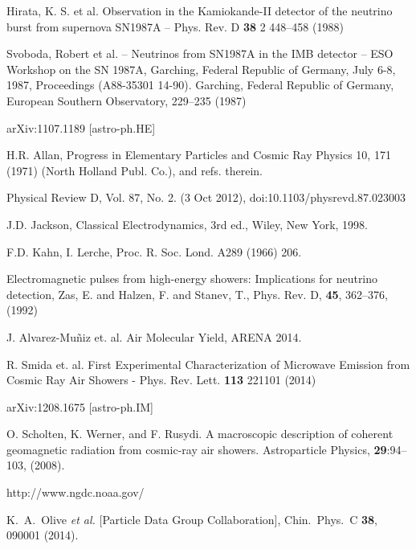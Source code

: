 \begin{thebibliography}{1}

 Hirata, K. S. et al. Observation in the Kamiokande-II detector of the neutrino burst from supernova SN1987A -- Phys. Rev. D \textbf{38} 2 448--458 (1988)

Svoboda, Robert et al. -- Neutrinos from SN1987A in the IMB detector -- ESO Workshop on the SN 1987A, Garching, Federal Republic of Germany, July 6-8, 1987, Proceedings (A88-35301 14-90). Garching, Federal Republic of Germany, European Southern Observatory,  229--235 (1987)

 arXiv:1107.1189 [astro-ph.HE]

 H.R. Allan, Progress in Elementary Particles and Cosmic Ray Physics 10, 171 (1971) (North Holland Publ. Co.), and refs. therein.

 Physical Review D, Vol. 87, No. 2. (3 Oct 2012), doi:10.1103/physrevd.87.023003 

 J.D. Jackson, Classical Electrodynamics, 3rd ed., Wiley, New York, 1998.

 F.D. Kahn, I. Lerche, Proc. R. Soc. Lond. A289 (1966) 206.

 Electromagnetic pulses from high-energy showers: Implications for neutrino detection, Zas, E. and Halzen, F. and Stanev, T., Phys. Rev. D, \textbf{45}, 362--376, (1992)

 J. Alvarez-Mu\~niz et. al. Air Molecular Yield, ARENA 2014.

 R. Smida et. al. First Experimental Characterization of Microwave Emission from Cosmic Ray Air Showers - Phys. Rev. Lett. \textbf{113} 221101 (2014)

 arXiv:1208.1675 [astro-ph.IM]


 O. Scholten, K. Werner, and F. Rusydi. A macroscopic description of coherent geomagnetic radiation from cosmic-ray air showers. Astroparticle Physics, {\bf 29}:94–103, (2008).

 http://www.ngdc.noaa.gov/

  K.~A.~Olive {\it et al.}  [Particle Data Group Collaboration],
  Chin.\ Phys.\ C {\bf 38}, 090001 (2014).


\end{thebibliography}
